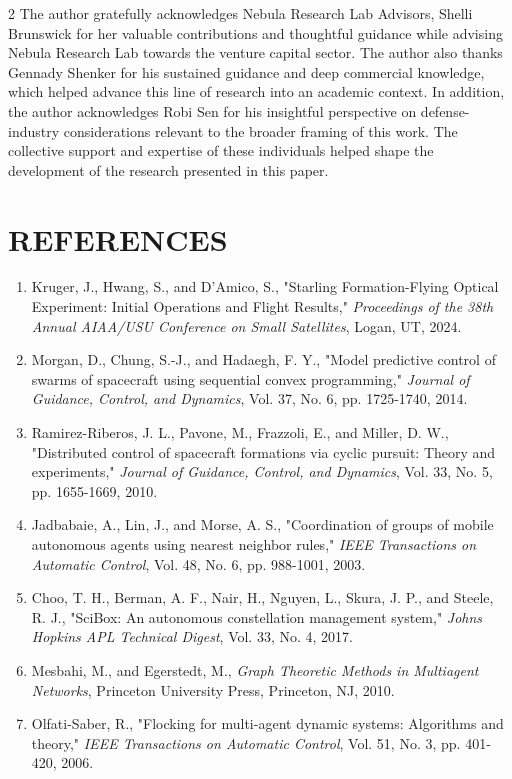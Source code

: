 \documentclass[fleqn,10pt,letterpaper]{article}
\begin{document}
\begin{multicols}{2}
The author gratefully acknowledges Nebula Research Lab Advisors, Shelli Brunswick for her valuable contributions and thoughtful guidance while advising Nebula Research Lab towards the venture capital sector. The author also thanks Gennady Shenker for his sustained guidance and deep commercial knowledge, which helped advance this line of research into an academic context. In addition, the author acknowledges Robi Sen for his insightful perspective on defense-industry considerations relevant to the broader framing of this work. The collective support and expertise of these individuals helped shape the development of the research presented in this paper.

\section{REFERENCES}
\begin{enumerate}
\item Kruger, J., Hwang, S., and D'Amico, S., "Starling Formation-Flying Optical Experiment: Initial Operations and Flight Results," \emph{Proceedings of the 38th Annual AIAA/USU Conference on Small Satellites}, Logan, UT, 2024.
\item Morgan, D., Chung, S.-J., and Hadaegh, F. Y., "Model predictive control of swarms of spacecraft using sequential convex programming," \emph{Journal of Guidance, Control, and Dynamics}, Vol. 37, No. 6, pp. 1725-1740, 2014.
\item Ramirez-Riberos, J. L., Pavone, M., Frazzoli, E., and Miller, D. W., "Distributed control of spacecraft formations via cyclic pursuit: Theory and experiments," \emph{Journal of Guidance, Control, and Dynamics}, Vol. 33, No. 5, pp. 1655-1669, 2010.
\item Jadbabaie, A., Lin, J., and Morse, A. S., "Coordination of groups of mobile autonomous agents using nearest neighbor rules," \emph{IEEE Transactions on Automatic Control}, Vol. 48, No. 6, pp. 988-1001, 2003.
\item Choo, T. H., Berman, A. F., Nair, H., Nguyen, L., Skura, J. P., and Steele, R. J., "SciBox: An autonomous constellation management system," \emph{Johns Hopkins APL Technical Digest}, Vol. 33, No. 4, 2017.
\item Mesbahi, M., and Egerstedt, M., \emph{Graph Theoretic Methods in Multiagent Networks}, Princeton University Press, Princeton, NJ, 2010.
\item Olfati-Saber, R., "Flocking for multi-agent dynamic systems: Algorithms and theory," \emph{IEEE Transactions on Automatic Control}, Vol. 51, No. 3, pp. 401-420, 2006.

\end{enumerate}
\end{multicols}
\end{document}
